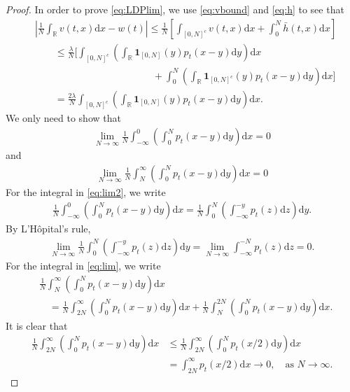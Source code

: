 \documentclass[10pt,a4paper]{amsart}
\newcommand{\R}{{\mathbb{R}}}
\renewcommand{\d}{\mathrm{d}}
\begin{document}
\begin{proof}
In order to prove \eqref{eq:LDPlim},
we use \eqref{eq:vbound} and \eqref{eq:h} to see that
\begin{align*}
&\left|\frac1N\int_\R v(t,x)\d x -w(t)\right| 
\leq \frac1N\left[\int_{[0, N]^c} v(t,x)\d x  + \int_0^N \bar{h}(t,x)\d x\right]\\
&\qquad\leq  \frac\lambda N\Big[\int_{[0, N]^c}\left(  \int_\R \bm{1}_{[0, N]}(y) p_t(x-y)\d y\right)\d x  \\
&\qquad\qquad\qquad\qquad \qquad\qquad
+ \int_0^N \left( \int_\R \bm{1}_{[0, N]^c}(y)p_t(x-y)\d y\right)\d x\Big]\\
&\qquad =\frac{2\lambda} N\int_{[0, N]^c}\left(  \int_\R \bm{1}_{[0, N]}(y) p_t(x-y)\d y\right)\d x.
\end{align*}
We only need to show that
\begin{align}\label{eq:lim2}
\lim_{N\to\infty} \frac1N\int_{-\infty}^0 \left(\int_0^N p_t(x-y)\d y\right) \d x =0
\end{align}
and
\begin{align}\label{eq:lim}
  \lim_{N\to\infty} \frac1N\int^{\infty}_N \left(\int_0^N p_t(x-y)\d y\right) \d x =0
\end{align}
For the integral in \eqref{eq:lim2}, we write
\begin{align*}
 \frac1N\int_{-\infty}^0 \left(\int_0^N p_t(x-y)\d y\right) \d x= \frac1N \int_0^N \left(\int_{-\infty}^{-y}p_t(z)\d z\right)\d y.
\end{align*}
By L'H\^opital's rule, 
\begin{align*}
\lim_{N\to\infty} \frac1N \int_0^N \left(\int_{-\infty}^{-y}p_t(z)\d z\right)\d y = \lim_{N\to\infty} \int_{-\infty}^{-N}p_t(z)\d z =0.
\end{align*}
For the  integral in \eqref{eq:lim}, we write
\begin{align*}
&\frac1N\int^{\infty}_N \left(\int_0^N p_t(x-y)\d y\right) \d x\\
& \quad= \frac1N\int^{\infty}_{2N} \left(\int_0^N p_t(x-y)\d y\right) \d x
+ \frac1N\int^{2N}_N \left(\int_0^N p_t(x-y)\d y\right) \d x.
\end{align*}
It is clear that
\begin{equation*} %
\begin{split}
 \frac1N\int^{\infty}_{2N} \left(\int_0^N p_t(x-y)\d y\right) \d x &\leq \frac1N \int^{\infty}_{2N} \left(\int_0^N p_t(x/2)\d y\right) \d x\\
 &=\int_{2N}^{\infty}p_t(x/2)\d x \to 0, \quad \text{as $N\to\infty$.}
\end{split}

\end{equation*}
\end{proof}
\end{document}
